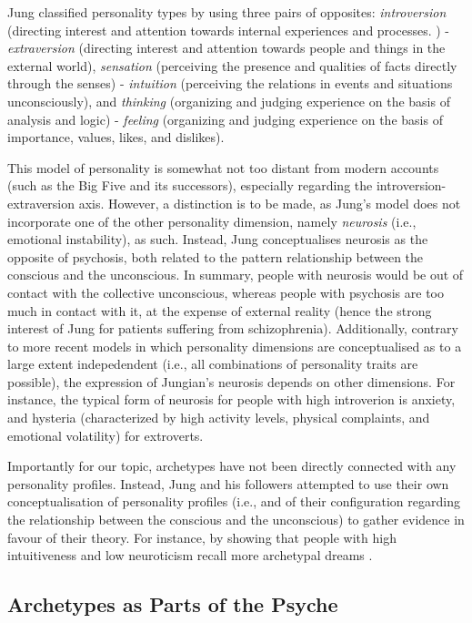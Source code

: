 \documentclass[
]{book}
\begin{document}
Jung classified personality types by using three pairs of opposites: \emph{introversion} (directing interest and attention towards internal experiences and processes. ) - \emph{extraversion} (directing interest and attention towards people and things in the external world), \emph{sensation} (perceiving the presence and qualities of facts directly through the senses) - \emph{intuition} (perceiving the relations in events and situations unconsciously), and \emph{thinking} (organizing and judging experience on the basis of analysis and logic) - \emph{feeling} (organizing and judging experience on the basis of importance, values, likes, and dislikes).

This model of personality is somewhat not too distant from modern accounts (such as the Big Five and its successors), especially regarding the introversion-extraversion axis. However, a distinction is to be made, as Jung's model does not incorporate one of the other personality dimension, namely \emph{neurosis} (i.e., emotional instability), as such. Instead, Jung conceptualises neurosis as the opposite of psychosis, both related to the pattern relationship between the conscious and the unconscious. In summary, people with neurosis would be out of contact with the collective unconscious, whereas people with psychosis are too much in contact with it, at the expense of external reality (hence the strong interest of Jung for patients suffering from schizophrenia). Additionally, contrary to more recent models in which personality dimensions are conceptualised as to a large extent indepedendent (i.e., all combinations of personality traits are possible), the expression of Jungian's neurosis depends on other dimensions. For instance, the typical form of neurosis for people with high introverion is anxiety, and hysteria (characterized by high activity levels, physical complaints, and emotional volatility) for extroverts.

Importantly for our topic, archetypes have not been directly connected with any personality profiles. Instead, Jung and his followers attempted to use their own conceptualisation of personality profiles (i.e., and of their configuration regarding the relationship between the conscious and the unconscious) to gather evidence in favour of their theory. For instance, by showing that people with high intuitiveness and low neuroticism recall more archetypal dreams \citep[i.e., dreams with less ``everydayness'';][]{kluger1975archetypal, cann1986jungian}.

\hypertarget{archetypes-as-parts-of-the-psyche}{%
\subsection{Archetypes as Parts of the Psyche}\label{archetypes-as-parts-of-the-psyche}}
\end{document}
